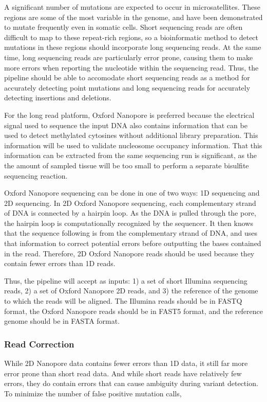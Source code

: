 A significant number of mutations are expected to occur in microsatellites.
These regions are some of the most variable in the genome, and have been demonstrated to mutate frequently even in somatic cells.
Short sequencing reads are often difficult to map to these repeat-rich regions, so a bioinformatic method to detect mutations in these regions should incorporate long sequencing reads. At the same time, long sequencing reads are particularly error prone, causing them to make more errors when reporting the nucleotide within the sequencing read. Thus, the pipeline should be able to accomodate short sequencing reads as a method for accurately detecting point mutations and long sequencing reads for accurately detecting insertions and deletions.

For the long read platform, Oxford Nanopore is preferred because the electrical signal used to sequence the input DNA also contains information that can be used to detect methylated cytosines without additional library preparation. This information will be used to validate nucleosome occupancy information. That this information can be extracted from the same sequencing run is significant, as the the amount of sampled tissue will be too small to perform a separate bisulfite sequencing reaction.

Oxford Nanopore sequencing can be done in one of two ways: 1D sequencing and 2D sequencing.
In 2D Oxford Nanopore sequencing, each complementary strand of DNA is connected by a hairpin loop. As the DNA is pulled through the pore, the hairpin loop is computationally recognized by the sequencer. It then knows that the sequence following is from the complementary strand of DNA, and uses that information to correct potential errors before outputting the bases contained in the read.
Therefore, 2D Oxford Nanopore reads should be used because they contain fewer errors than 1D reads.

Thus, the pipeline will accept as inputs: 1) a set of short Illumina sequencing reads, 2) a set of Oxford Nanopore 2D reads, and 3) the reference of the genome to which the reads will be aligned. The Illumina reads should be in FASTQ format, the Oxford Nanopore reads should be in FAST5 format, and the reference genome should be in FASTA format.

\subsubsection{Read Correction}
While 2D Nanopore data contains fewer errors than 1D data, it still far more error prone than short read data.
And while short reads have relatively few errors, they do contain errors that can cause ambiguity during variant detection.
To minimize the number of false positive mutation calls, 




